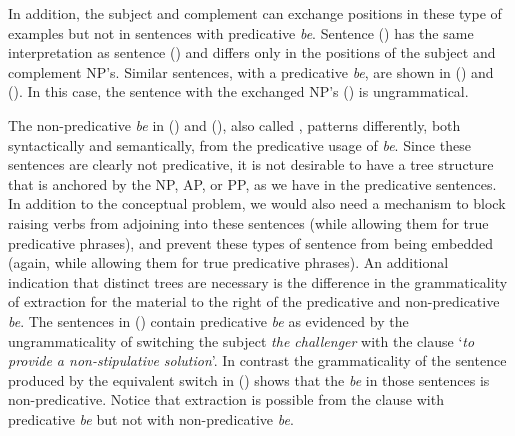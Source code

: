 


In addition, the subject and complement can exchange positions in these type of
examples but not in sentences with predicative {\it be}.  Sentence ({})
has the same interpretation as sentence ({}) and differs only in the
positions of the subject and complement NP's. Similar sentences, with a
predicative {\it be}, are shown in ({}) and ({}).  In this case,
the sentence with the exchanged NP's ({}) is ungrammatical.


The non-predicative {\it be} in ({}) and ({}), also called
, patterns differently, both syntactically and
semantically, from the predicative usage of {\it be}.  Since these sentences
are clearly not predicative, it is not desirable to have a tree structure that
is anchored by the NP, AP, or PP, as we have in the predicative sentences.  In
addition to the conceptual problem, we would also need a mechanism to block
raising verbs from adjoining into these sentences (while allowing them for true
predicative phrases), and prevent these types of sentence from being embedded
(again, while allowing them for true predicative phrases).  An additional
indication that distinct trees are necessary is the difference in the
grammaticality of extraction for the material to the right of the predicative
and non-predicative {\it be}.  The sentences in ({}) contain predicative
{\it be} as evidenced by the ungrammaticality of switching the subject {\it the
challenger} with the clause `{\it to provide a non-stipulative solution}'. In
contrast the grammaticality of the sentence produced by the equivalent switch
in ({}) shows that the {\it be} in those sentences is
non-predicative. Notice that extraction is possible from the clause with
predicative {\it be} but not with non-predicative {\it be}.


